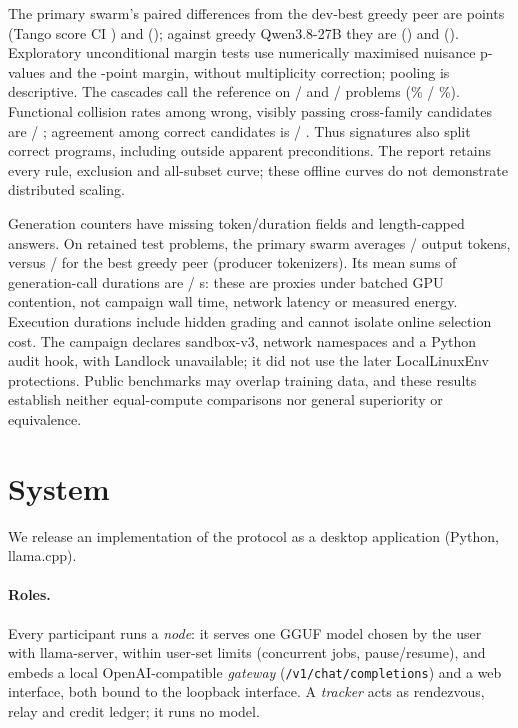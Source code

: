 \documentclass[11pt]{article}
\theoremstyle{definition}
\theoremstyle{remark}
\begin{document}
The primary swarm's paired differences from the dev-best greedy peer are
\eElevenHumanBestGain{} points (Tango score CI \eElevenHumanBestGainCI) and
\eElevenMbppBestGain{} (\eElevenMbppBestGainCI); against greedy Qwen3.8-27B they are
\eElevenHumanRefGain{} (\eElevenHumanRefGainCI) and \eElevenMbppRefGain{} (\eElevenMbppRefGainCI).
Exploratory unconditional margin tests use numerically maximised nuisance p-values and the
\eElevenMargin{}-point margin, without multiplicity correction; pooling is descriptive.
The cascades call the reference on \eElevenHumanCalls{}/\eElevenHumanN{} and
\eElevenMbppCalls{}/\eElevenMbppN{} problems (\eElevenHumanCallPct\% / \eElevenMbppCallPct\%).
Functional collision rates among wrong, visibly passing cross-family candidates are
\eElevenHumanCollision{} / \eElevenMbppCollision{}; agreement among correct candidates is
\eElevenHumanCorrectAgreement{} / \eElevenMbppCorrectAgreement{}. Thus signatures also split correct
programs, including outside apparent preconditions. The report retains every rule, exclusion and
all-subset curve; these offline curves do not demonstrate distributed scaling.

Generation counters have \eElevenMissing{} missing token/duration fields and
\eElevenLength{} length-capped answers. On retained test problems, the primary swarm averages
\eElevenHumanSwarmTokens{} / \eElevenMbppSwarmTokens{} output tokens, versus
\eElevenHumanSoloTokens{} / \eElevenMbppSoloTokens{} for the best greedy peer (producer tokenizers).
Its mean sums of generation-call durations are \eElevenHumanSwarmSeconds{} / \eElevenMbppSwarmSeconds{} s:
these are proxies under batched GPU contention, not campaign wall time, network latency or measured
energy. Execution durations include hidden grading and cannot isolate online selection cost.
The campaign declares sandbox-v3, network namespaces and a Python audit hook, with Landlock unavailable;
it did not use the later LocalLinuxEnv protections. Public benchmarks may overlap training data, and
these results establish neither equal-compute comparisons nor general superiority or equivalence.

\section{System}\label{sec:system}
We release an implementation of the protocol as a desktop application (Python, llama.cpp).
\paragraph{Roles.} Every participant runs a \emph{node}: it serves one GGUF model chosen by the user with
llama-server, within user-set limits (concurrent jobs, pause/resume), and embeds a local
OpenAI-compatible \emph{gateway} (\texttt{/v1/chat/completions}) and a web interface, both bound to the
loopback interface. A \emph{tracker} acts as rendezvous, relay and credit ledger; it runs no model.
\end{document}
